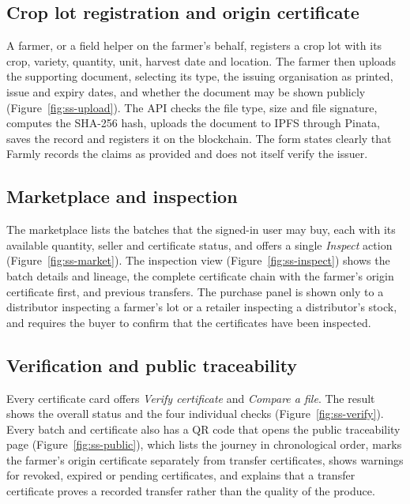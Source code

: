 
\subsection*{Crop lot registration and origin certificate}
A farmer, or a field helper on the farmer's behalf, registers a crop lot with its crop, variety, quantity, unit, harvest date and location. The farmer then uploads the supporting document, selecting its type, the issuing organisation as printed, issue and expiry dates, and whether the document may be shown publicly (Figure~\ref{fig:ss-upload}). The API checks the file type, size and file signature, computes the SHA-256 hash, uploads the document to IPFS through Pinata, saves the record and registers it on the blockchain. The form states clearly that Farmly records the claims as provided and does not itself verify the issuer.


\subsection*{Marketplace and inspection}
The marketplace lists the batches that the signed-in user may buy, each with its available quantity, seller and certificate status, and offers a single \textit{Inspect} action (Figure~\ref{fig:ss-market}). The inspection view (Figure~\ref{fig:ss-inspect}) shows the batch details and lineage, the complete certificate chain with the farmer's origin certificate first, and previous transfers. The purchase panel is shown only to a distributor inspecting a farmer's lot or a retailer inspecting a distributor's stock, and requires the buyer to confirm that the certificates have been inspected.


\subsection*{Verification and public traceability}
Every certificate card offers \textit{Verify certificate} and \textit{Compare a file}. The result shows the overall status and the four individual checks (Figure~\ref{fig:ss-verify}). Every batch and certificate also has a QR code that opens the public traceability page (Figure~\ref{fig:ss-public}), which lists the journey in chronological order, marks the farmer's origin certificate separately from transfer certificates, shows warnings for revoked, expired or pending certificates, and explains that a transfer certificate proves a recorded transfer rather than the quality of the produce.

